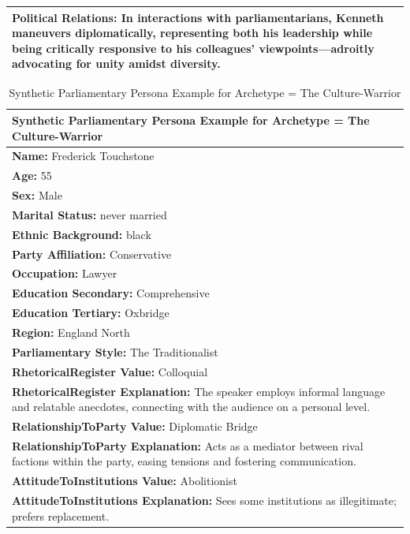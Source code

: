 \documentclass[11pt]{article}
\begin{document}
\begin{table}[ht]
\begin{tabularx}{\textwidth}{X}
\textbf{Political Relations:} In interactions with parliamentarians, Kenneth maneuvers diplomatically, representing both his leadership while being critically responsive to his colleagues' viewpoints—adroitly advocating for unity amidst diversity. \\

\bottomrule
\end{tabularx}
\end{table}


\begin{table}[ht]
\centering
\caption{Synthetic Parliamentary Persona Example for Archetype = The Culture-Warrior}
\label{tab:parliamentry-persona-example-5}
\scriptsize %
\begin{tabularx}{\textwidth}{X}
\toprule
\textbf{Synthetic Parliamentary Persona Example for Archetype = The Culture-Warrior} \\
\midrule
\textbf{Name:} Frederick Touchstone \\
\textbf{Age:} 55 \\
\textbf{Sex:} Male \\
\textbf{Marital Status:} never married \\
\textbf{Ethnic Background:} black \\
\textbf{Party Affiliation:} Conservative \\
\textbf{Occupation:} Lawyer \\
\textbf{Education Secondary:} Comprehensive \\
\textbf{Education Tertiary:} Oxbridge \\
\textbf{Region:} England North \\
\textbf{Parliamentary Style:} The Traditionalist \\[4pt]

\textbf{RhetoricalRegister Value:} Colloquial \\
\textbf{RhetoricalRegister Explanation:} The speaker employs informal language and relatable anecdotes, connecting with the audience on a personal level. \\[4pt]

\textbf{RelationshipToParty Value:} Diplomatic Bridge \\
\textbf{RelationshipToParty Explanation:} Acts as a mediator between rival factions within the party, easing tensions and fostering communication. \\[4pt]

\textbf{AttitudeToInstitutions Value:} Abolitionist \\
\textbf{AttitudeToInstitutions Explanation:} Sees some institutions as illegitimate; prefers replacement. \\[4pt]


\end{tabularx}
\end{table}
\end{document}
